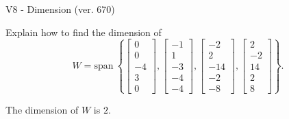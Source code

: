 \begin{exercise}
  \begin{exerciseTitle}V8 - Dimension (ver. 670)\end{exerciseTitle}
  \begin{exerciseStatement}
    Explain how to find the dimension of 
\[W=\mathrm{span}\ \left\{\left[\begin{array}{r}
0 \\
0 \\
-4 \\
3 \\
0
\end{array}\right] , \left[\begin{array}{r}
-1 \\
1 \\
-3 \\
-4 \\
-4
\end{array}\right] , \left[\begin{array}{r}
-2 \\
2 \\
-14 \\
-2 \\
-8
\end{array}\right] , \left[\begin{array}{r}
2 \\
-2 \\
14 \\
2 \\
8
\end{array}\right]\right\}.\]



  \end{exerciseStatement}
  \begin{exerciseAnswer}
   The dimension of \(W\) is  \(2\).
  


  \end{exerciseAnswer}
\end{exercise}